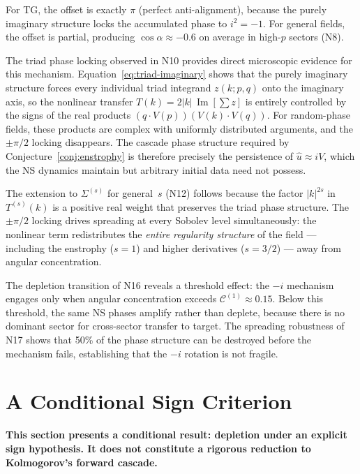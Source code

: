 \documentclass[11pt]{article}
\theoremstyle{definition}
\newcommand{\cC}{\mathcal{C}}
\DeclareMathOperator{\im}{Im}
\begin{document}
For TG, the offset is exactly $\pi$ (perfect
anti-alignment), because the purely imaginary structure
locks the accumulated phase to $i^2=-1$.  For general
fields, the offset is partial, producing
$\cos\alpha\approx-0.6$ on average in high-$p$ sectors
(N8).

The triad phase locking observed in N10 provides
direct microscopic evidence for this mechanism.
Equation~\eqref{eq:triad-imaginary} shows that the
purely imaginary structure forces every individual
triad integrand $z(k;p,q)$ onto the imaginary axis,
so the nonlinear transfer $T(k) = 2|k|\,\im[\sum z]$
is entirely controlled by the signs of the real
products $(q\cdot V(p))(V(k)\cdot V(q))$.  For
random-phase fields, these products are complex
with uniformly distributed arguments, and the
$\pm\pi/2$ locking disappears.  The cascade phase
structure required by Conjecture~\ref{conj:enstrophy}
is therefore precisely the persistence of
$\hat u\approx iV$, which the NS dynamics maintain
but arbitrary initial data need not possess.

The extension to $\Sigma^{(s)}$ for general~$s$ (N12)
follows because the factor $|k|^{2s}$ in $T^{(s)}(k)$
is a positive real weight that preserves the triad
phase structure.  The $\pm\pi/2$ locking drives
spreading at every Sobolev level simultaneously: the
nonlinear term redistributes the \emph{entire regularity
structure} of the field --- including the enstrophy
($s=1$) and higher derivatives ($s=3/2$) --- away from
angular concentration.

The depletion transition of N16 reveals a threshold
effect: the $-i$ mechanism engages only when angular
concentration exceeds $\cC^{(1)}\approx 0.15$.  Below
this threshold, the same NS phases amplify rather than
deplete, because there is no dominant sector for
cross-sector transfer to target.  The spreading
robustness of N17 shows that 50\% of the phase
structure can be destroyed before the mechanism fails,
establishing that the $-i$ rotation is not fragile.

\section{A Conditional Sign Criterion}
\label{sec:conditional}

\textbf{This section presents a conditional result:
depletion under an explicit sign hypothesis.  It does
not constitute a rigorous reduction to Kolmogorov's
forward cascade.}
\end{document}
